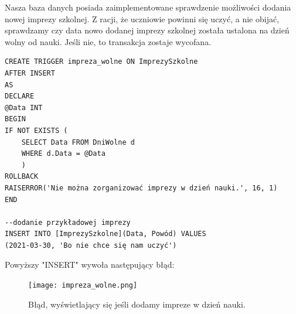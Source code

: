 \documentclass[60pt]{article}
\begin{document}
Nasza baza danych posiada zaimplementowane sprawdzenie możliwości dodania nowej imprezy szkolnej. Z racji, że uczniowie powinni się uczyć, a nie obijać, sprawdzamy czy data nowo dodanej imprezy szkolnej została ustalona na dzień wolny od nauki. Jeśli nie, to transakcja zostaje wycofana.

\begin{verbatim}
CREATE TRIGGER impreza_wolne ON ImprezySzkolne
AFTER INSERT
AS 
DECLARE
@Data INT
BEGIN
IF NOT EXISTS (
    SELECT Data FROM DniWolne d
    WHERE d.Data = @Data
    )
ROLLBACK
RAISERROR('Nie można zorganizować imprezy w dzień nauki.', 16, 1)
END

--dodanie przykładowej imprezy
INSERT INTO [ImprezySzkolne](Data, Powód) VALUES
(2021-03-30, 'Bo nie chce się nam uczyć')
\end{verbatim}

Powyższy "INSERT" wywoła następujący błąd:

\begin{figure}[h]
  \texttt{[image: impreza\_wolne.png]}
  \caption{Błąd, wyświetlający się jeśli dodamy impreze w dzień nauki.}
  \label{Błąd, wyświetlający się jeśli dodamy impreze w dzień nauki.}
\end{figure}
\end{document}
